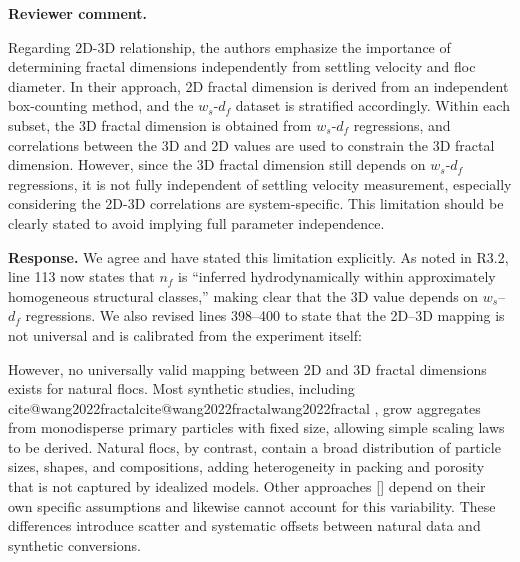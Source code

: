 \documentclass[11pt]{article}
\makeatletter
\newenvironment{Snippet}{%
  \par\vspace{0.3em}\begin{list}{}{\setlength{\leftmargin}{1em}\setlength{\rightmargin}{0.5em}}\item\small\itshape
}{%
  \end{list}\vspace{0.3em}
}
\newcommand{\citelookup}[1]{%
  \ifcsname cite@#1\endcsname\csname cite@#1\endcsname\else #1\fi
}
\newcommand{\citeformat}[1]{%
  \def\citelist{}%
  \forcsvlist{\addtocitelist}{#1}%
  \textup{[\citelist]}%
}
\newcommand{\addtocitelist}[1]{%
  \ifx\citelist\empty
    \edef\citelist{\citelookup{#1}}%
  \else
    \edef\citelist{\citelist;\space\citelookup{#1}}%
  \fi
}
\renewcommand{\cite}[1]{\citeformat{#1}}
\newcommand{\citeA}[1]{\textup{\citelookup{#1}}}
\makeatother
\begin{document}
\begin{enumerate}[label=\textbf{R3.\arabic*.}]
\item \textbf{Reviewer comment.}
\begin{Snippet}
Regarding 2D-3D relationship, the authors emphasize the importance of determining fractal dimensions independently from settling velocity and floc diameter. In their approach, 2D fractal dimension is derived from an independent box-counting method, and the $w_s$-$d_f$ dataset is stratified accordingly. Within each subset, the 3D fractal dimension is obtained from $w_s$-$d_f$ regressions, and correlations between the 3D and 2D values are used to constrain the 3D fractal dimension. However, since the 3D fractal dimension still depends on $w_s$-$d_f$ regressions, it is not fully independent of settling velocity measurement, especially considering the 2D-3D correlations are system-specific. This limitation should be clearly stated to avoid implying full parameter independence.
\end{Snippet}
\textbf{Response.}
We agree and have stated this limitation explicitly. As noted in R3.2, line 113 now states that $n_f$ is ``inferred hydrodynamically within approximately homogeneous structural classes,'' making clear that the 3D value depends on $w_s$--$d_f$ regressions. We also revised lines 398--400 to state that the 2D--3D mapping is not universal and is calibrated from the experiment itself:
\begin{Snippet}
However, no universally valid mapping between 2D and 3D fractal dimensions exists for natural flocs. Most synthetic studies, including \citeA{wang2022fractal}, grow aggregates from monodisperse primary particles with fixed size, allowing simple scaling laws to be derived. Natural flocs, by contrast, contain a broad distribution of particle sizes, shapes, and compositions, adding heterogeneity in packing and porosity that is not captured by idealized models. Other approaches \cite{maggi2004method, tang2015reconstructing} depend on their own specific assumptions and likewise cannot account for this variability. These differences introduce scatter and systematic offsets between natural data and synthetic conversions.


\end{Snippet}
\end{enumerate}
\end{document}
